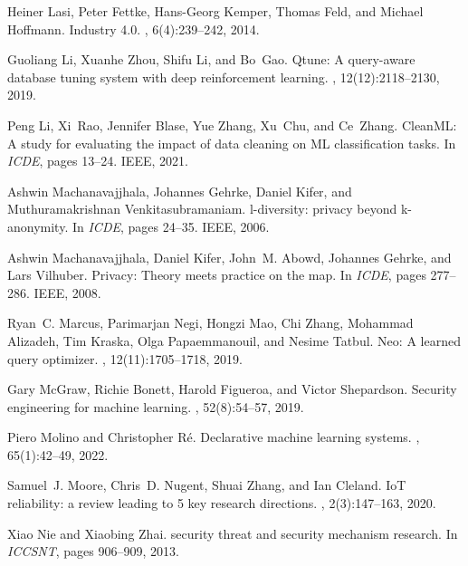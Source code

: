 \documentclass[11pt]{article}
\begin{document}
\begin{thebibliography}{10}
Heiner Lasi, Peter Fettke, Hans-Georg Kemper, Thomas Feld, and Michael
  Hoffmann.
\newblock Industry 4.0.
, 6(4):239--242,
  2014.

Guoliang Li, Xuanhe Zhou, Shifu Li, and Bo~Gao.
\newblock Qtune: {A} query-aware database tuning system with deep reinforcement
  learning.
, 12(12):2118--2130, 2019.

Peng Li, Xi~Rao, Jennifer Blase, Yue Zhang, Xu~Chu, and Ce~Zhang.
\newblock Clean{ML}: {A} study for evaluating the impact of data cleaning on
  {ML} classification tasks.
\newblock In {\em ICDE}, pages 13--24. {IEEE}, 2021.

Ashwin Machanavajjhala, Johannes Gehrke, Daniel Kifer, and Muthuramakrishnan
  Venkitasubramaniam.
\newblock l-diversity: privacy beyond k-anonymity.
\newblock In {\em ICDE}, pages 24--35. IEEE, 2006.

Ashwin Machanavajjhala, Daniel Kifer, John~M. Abowd, Johannes Gehrke, and Lars
  Vilhuber.
\newblock Privacy: Theory meets practice on the map.
\newblock In {\em ICDE}, pages 277--286. IEEE, 2008.

Ryan~C. Marcus, Parimarjan Negi, Hongzi Mao, Chi Zhang, Mohammad Alizadeh, Tim
  Kraska, Olga Papaemmanouil, and Nesime Tatbul.
\newblock Neo: {A} learned query optimizer.
, 12(11):1705--1718, 2019.

Gary McGraw, Richie Bonett, Harold Figueroa, and Victor Shepardson.
\newblock Security engineering for machine learning.
, 52(8):54--57, 2019.

Piero Molino and Christopher R{\'{e}}.
\newblock Declarative machine learning systems.
, 65(1):42--49, 2022.

Samuel~J. Moore, Chris~D. Nugent, Shuai Zhang, and Ian Cleland.
\newblock Io{T} reliability: a review leading to 5 key research directions.
, 2(3):147--163, 2020.

Xiao Nie and Xiaobing Zhai.
 security threat and security mechanism research.
\newblock In {\em ICCSNT}, pages 906--909, 2013.


\end{thebibliography}
\end{document}
